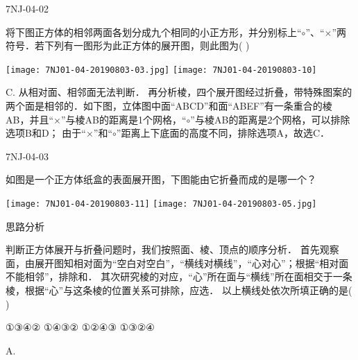 \begin{defproblem}{7NJ-04-02}%
\begin{onlyproblem}%
将下图正方体的相邻两面各划分成九个相同的小正方形，并分别标上“$\circ$”、“$\times$”两符号．若下列有一图形为此正方体的展开图，则此图为(    ) 
\begin{center}
\texttt{[image: 7NJ01-04-20190803-03.jpg]}
\texttt{[image: 7NJ01-04-20190803-10]}
\end{center}
\end{onlyproblem}%
\begin{onlysolution}%
\begin{solution}%
C.
从相对面、相邻面无法判断． 再分析棱，四个展开图经过折叠，带特殊图案的两个面是相邻的．如下图，立体图中面“ABCD”和面“ABEF”有一条重合的棱AB，并且“$\times$”与棱AB的距离是1个网格，“$\circ$”与棱AB的距离是2个网格，可以排除选项B和D； 由于“$\times$”和“$\circ$”距离上下底面的高度不同，排除选项A，故选C． 

\end{solution}%
\end{onlysolution}%
\end{defproblem}



\begin{defproblem}{7NJ-04-03}%
\begin{onlyproblem}%
如图是一个正方体纸盒的表面展开图，下图能由它折叠而成的是哪一个？ 
\begin{center}
\texttt{[image: 7NJ01-04-20190803-11]}
\texttt{[image: 7NJ01-04-20190803-05.jpg]}
\end{center}
思路分析 

判断正方体展开与折叠问题时，我们按照面、棱、顶点的顺序分析． 首先观察面，由展开图知相对面为“空白对空白”，“横线对横线”，“心对心”；根据“相对面不能相邻”，排除\underline{\hspace*{2cm}}和\underline{\hspace*{2cm}}． 其次研究棱的对应，“心”所在面与“横线”所在面相交于一条棱，根据“心”与这条棱的位置关系可排除\underline{\hspace*{2cm}}，应选\underline{\hspace*{2cm}}． 以上横线处依次所填正确的是(    ) 

\xx
{①③④②}
{①④③②}
{①②④③}
{①③②④}
\end{onlyproblem}%
\begin{onlysolution}%
\begin{solution}%
A.

\end{solution}%
\end{onlysolution}%
\end{defproblem}




